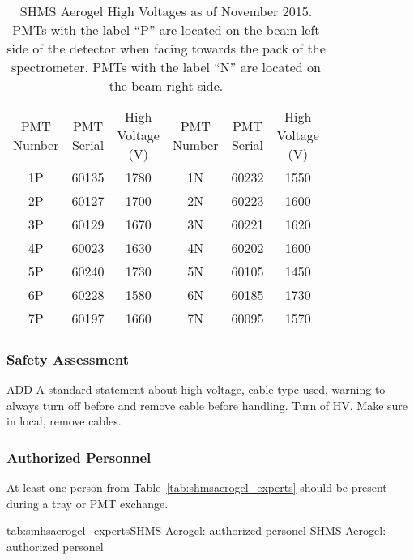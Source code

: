 \begin{table}
\caption{SHMS Aerogel High Voltages as of November 2015.  PMTs with
  the label ``P'' are located on the beam left side of the detector
  when facing towards the pack of the spectrometer.  PMTs with the
  label ``N'' are located on the beam right side.
\label{tab:shms_aerogelhv}}
\begin{center}
\begin{tabular}{cccccc}
\specialcell{PMT\\Number}&\specialcell{PMT\\Serial}
&\specialcell{High\\Voltage\\(V)}&\specialcell{PMT\\Number}
&\specialcell{PMT\\Serial}&\specialcell{High\\Voltage\\(V)}\\
1P & 60135 & 1780 & 1N & 60232 & 1550\\
2P & 60127 & 1700 & 2N & 60223 & 1600\\
3P & 60129 & 1670 & 3N & 60221 & 1620\\
4P & 60023 & 1630 & 4N & 60202 & 1600\\
5P & 60240 & 1730 & 5N & 60105 & 1450\\
6P & 60228 & 1580 & 6N & 60185 & 1730\\
7P & 60197 & 1660 & 7N & 60095 & 1570\\
\end{tabular}
\end{center}
\end{table}


\begin{safetyen}{0}{0}

\subsubsection{Safety Assessment}

ADD A standard statement about high voltage, cable type used, warning
to always turn off before and remove cable before handling.  
Turn of HV.  Make sure in local, remove cables.


\subsubsection{Authorized Personnel}
At least one person from Table~\ref{tab:shmsaerogel_experts} should be
present during a tray or PMT exchange.

\begin{namestab}{tab:smhsaerogel_experts}{SHMS Aerogel: authorized personel}{
    SHMS Aerogel: authorized personel}
  \ArthurMkrtchyan{}
  \MarcoCarmignotto{}
  \TanjaHorn{}
  \ArshakAsaturyan{}
  \VardanTadevosyan{}
  \HamletMkrtchyan{}
\end{namestab}

\end{safetyen}
